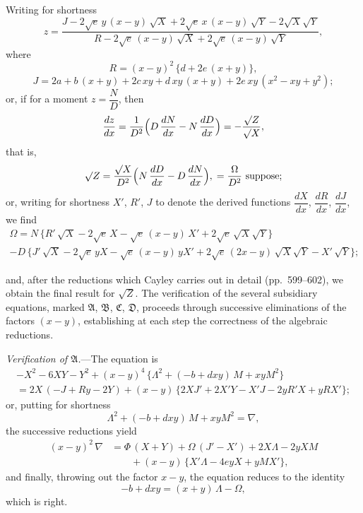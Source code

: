 \documentclass[12pt,a4paper]{article}
\begin{document}
\newpage

\noindent
Writing for shortness
\[
z = \frac{J - 2\surd e\,y\,(x-y)\,\surd X + 2\surd e\,x\,(x-y)\,\surd Y - 2\surd X\surd Y}{R - 2\surd e\,(x-y)\,\surd X + 2\surd e\,(x-y)\,\surd Y},
\]
where
\[
R = (x-y)^2\,\{d + 2e\,(x+y)\},
\]
\[
J = 2a + b\,(x+y) + 2c\,xy + d\,xy\,(x+y) + 2e\,xy\,(x^2-xy+y^2);
\]
or, if for a moment $z = \dfrac{N}{D}$, then
\[
\frac{dz}{dx} = \frac{1}{D^2}\Bigl(D\,\frac{dN}{dx} - N\,\frac{dD}{dx}\Bigr) = -\frac{\surd Z}{\surd X},
\]
that is,
\[
\surd Z = \frac{\surd X}{D^2}\Bigl(N\,\frac{dD}{dx} - D\,\frac{dN}{dx}\Bigr),\; = \frac{\Omega}{D^2} \text{ suppose};
\]
or, writing for shortness $X'$, $R'$, $J$ to denote the derived functions $\dfrac{dX}{dx}$, $\dfrac{dR}{dx}$, $\dfrac{dJ}{dx}$, we find
\begin{multline*}
\Omega = N\,\{R'\,\surd X - 2\surd e\,X - \surd e\,(x-y)\,X' + 2\surd e\,\surd X\surd Y\} \\
- D\,\{J'\,\surd X - 2\surd e\,yX - \surd e\,(x-y)\,yX' + 2\surd e\,(2x-y)\,\surd X\surd Y - X'\,\surd Y\};
\end{multline*}

and, after the reductions which Cayley carries out in detail (pp.~599--602), we obtain the final result for $\surd Z$. The verification of the several subsidiary equations, marked $\mathfrak{A}$, $\mathfrak{B}$, $\mathfrak{C}$, $\mathfrak{D}$, proceeds through successive eliminations of the factors $(x-y)$, establishing at each step the correctness of the algebraic reductions.

\vspace{2ex}
\textit{Verification of $\mathfrak{A}$.}---The equation is
\begin{align*}
-X^2 - 6XY - Y^2 + (x-y)^4\,\{\Lambda^2 + (-b+dxy)\,M + xyM^2\} \\
= 2X\,(-J+Ry-2Y) + (x-y)\,\{2XJ' + 2X'Y - X'J - 2yR'X + yRX'\};
\end{align*}
or, putting for shortness
\[
\Lambda^2 + (-b+dxy)\,M + xyM^2 = \nabla,
\]
the successive reductions yield
\begin{align*}
(x-y)^2\,\nabla &= \Phi\,(X+Y) + \Omega\,(J'-X') + 2X\Lambda - 2yXM \\
&\qquad + (x-y)\,\{X'\Lambda - 4eyX + yMX'\},
\end{align*}
and finally, throwing out the factor $x-y$, the equation reduces to the identity
\[
-b + dxy = (x+y)\,\Lambda - \Omega,
\]
which is right.
\end{document}
